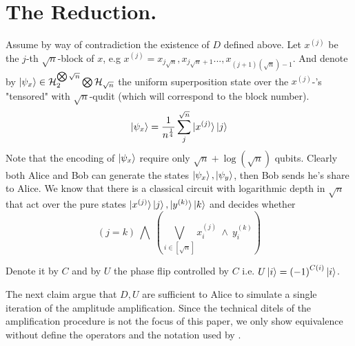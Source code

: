 \documentclass{article}
\begin{document}
\section{The Reduction.} 
Assume by way of contradiction the existence of $D$ defined above.  
Let \( x^{(j)} \) be the \(j\)-th \(\sqrt{n}\)-block of \(x\), e.g \(x^{(j)} = x_{j\sqrt{n}},x_{j\sqrt{n}+1}...,x_{(j+1)(\sqrt{n})-1}  \). And denote by \( \ket{\psi_x} \in \mathcal{H}_{2}^{\bigotimes \sqrt{n}} \bigotimes \mathcal{H}_{\sqrt{n}} \) the uniform superposition state over the \( x^{(j)}\)-'s "tensored" with \(\sqrt{n}\)-qudit (which will correspond to the block number). 
\[ \ket{\psi_x} = \frac{1}{n^\frac{1}{4}}\sum_{j}^{\sqrt{n}}\ket{x^{(j)}}\ket{j} \] Note that the encoding of \( \ket{\psi_x} \) require only \( \sqrt{n} + \log(\sqrt{n}) \) qubits.
Clearly both Alice and Bob can generate the states \( \ket{\psi_x}, \ket{\psi_y} \), then Bob sends he's share to Alice.
We know that there is a classical circuit with logarithmic depth in \( \sqrt{n} \) that act over the pure states \( \ket{x^{(j)}}\ket{j} , \ket{y^{(k)}}\ket{k} \) and decides whether \[ \left( j =  k \right) \ \bigwedge  \ \left( \bigvee_{i \in [ \sqrt{n} ] } x^{(j)}_{i} \ \wedge \  y^{(k)}_{i} \right)   \]


Denote it by \( C \) and by \( U \) the phase flip controlled by $C$ i.e. $U\ket{i}=\left( -1 \right)^{C\left( i \right)}\ket{i}$. 

The next claim argue that $D,U$ are sufficient to Alice to simulate a single iteration of the amplitude amplification. Since the technical ditels of the amplification procedure is not the focus of this paper, we only show equivalence without define the operators and the notation used by \cite{Brassard_2002}.   
\end{document}

